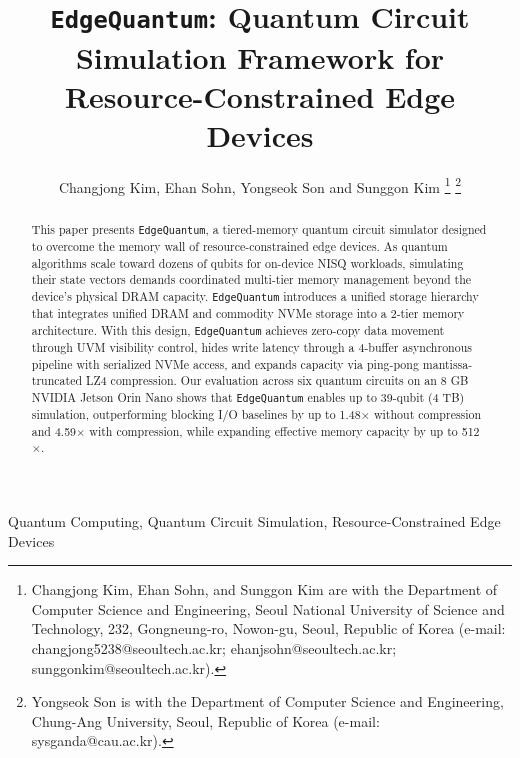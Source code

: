 \documentclass[journal]{IEEEtran}
\newcommand{\edgeQsim}{\texttt{EdgeQuantum}\xspace}
\newcommand{\EdgeQuantum}{\texttt{EdgeQuantum}\xspace}
\begin{document}
\IEEEaftertitletext{\vspace{-1.5\baselineskip}}


\title{\edgeQsim: Quantum Circuit Simulation Framework for Resource-Constrained Edge Devices}

\author{Changjong Kim, Ehan Sohn, Yongseok Son and Sunggon Kim
\thanks{Changjong Kim, Ehan Sohn, and Sunggon Kim are with the Department of Computer Science and Engineering, Seoul National University of Science and Technology, 232, Gongneung-ro, Nowon-gu, Seoul, Republic of Korea (e-mail: changjong5238@seoultech.ac.kr; ehanjsohn@seoultech.ac.kr; sunggonkim@seoultech.ac.kr).}
\thanks{Yongseok Son is with the Department of Computer Science and Engineering, Chung-Ang University, Seoul, Republic of Korea (e-mail: sysganda@cau.ac.kr).}
}

\maketitle
\begin{abstract}
This paper presents \EdgeQuantum, a tiered-memory quantum circuit simulator designed to overcome the memory wall of resource-constrained edge devices. As quantum algorithms scale toward dozens of qubits for on-device NISQ workloads, simulating their state vectors demands coordinated multi-tier memory management beyond the device's physical DRAM capacity. \EdgeQuantum introduces a unified storage hierarchy that integrates unified DRAM and commodity NVMe storage into a 2-tier memory architecture. With this design, \EdgeQuantum achieves zero-copy data movement through UVM visibility control, hides write latency through a 4-buffer asynchronous pipeline with serialized NVMe access, and expands capacity via ping-pong mantissa-truncated LZ4 compression. Our evaluation across six quantum circuits on an 8 GB NVIDIA Jetson Orin Nano shows that \EdgeQuantum enables up to 39-qubit (4 TB) simulation, outperforming blocking I/O baselines by up to 1.48$\times$ without compression and 4.59$\times$ with compression, while expanding effective memory capacity by up to 512$\times$.
\end{abstract}

\begin{IEEEkeywords}
Quantum Computing, Quantum Circuit Simulation, Resource-Constrained Edge Devices
\end{IEEEkeywords}









\end{document}

